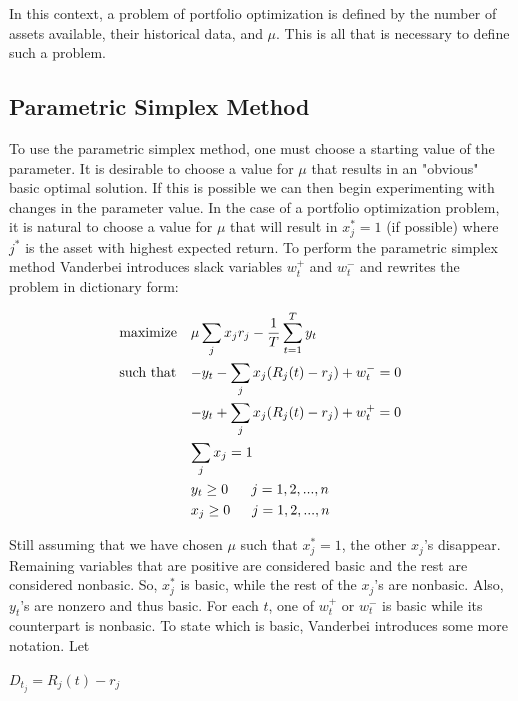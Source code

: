 \documentclass{article}
\begin{document}
\begin{notes}
\item In this context, a problem of portfolio optimization is defined by the number of assets available, their historical data, and $\mu$. This is all that is necessary to define such a problem.
\end{notes}

\subsection{Parametric Simplex Method}

To use the parametric simplex method, one must choose a starting value of the parameter. It is desirable to choose a value for $\mu$ that results in an "obvious" basic optimal solution. If this is possible we can then begin experimenting with changes in the parameter value. In the case of a portfolio optimization problem, it is natural to choose a value for $\mu$ that will result in $x_j^* = 1$ (if possible) where $j^*$ is the asset with highest expected return. To perform the parametric simplex method Vanderbei introduces slack variables $w_t^+$ and $w_t^-$ and rewrites the problem in dictionary form:

\begin{align*}
&\text{maximize}  &&\text{$\mu\sum_{j} x_jr_j - \frac{1}{T}\sum_{t=1}^{T} y_t$}\\
&\text{such that}  &&\text{$-y_t - \sum_{j} x_j(R_j(t)-r_j)+w_t^- = 0$}\\
&\text{}  &&\text{$-y_t + \sum_{j} x_j(R_j(t)-r_j)+w_t^+ = 0$}\\
&\text{}  &&\text{$\sum_{j} x_j = 1$}\\
&\text{}  &&\text{$y_t \geq 0$ \hspace{10pt} $j = 1,2,...,n$}\\
&\text{}  &&\text{$x_j \geq 0$ \hspace{9pt} $j = 1,2,...,n$}
\end{align*}

Still assuming that we have chosen $\mu$ such that $x_j^* = 1$, the other $x_j$'s disappear. Remaining variables that are positive are considered basic and the rest are considered nonbasic. So, $x_j^*$ is basic, while the rest of the $x_j$'s are nonbasic. Also, $y_t$'s are nonzero and thus basic. For each $t$, one of $w_t^+$ or $w_t^-$ is basic while its counterpart is nonbasic. To state which is basic, Vanderbei introduces some more notation. Let

\begin{center}
    $D_t_j = R_j(t) - r_j$
\end{center}
\end{document}
